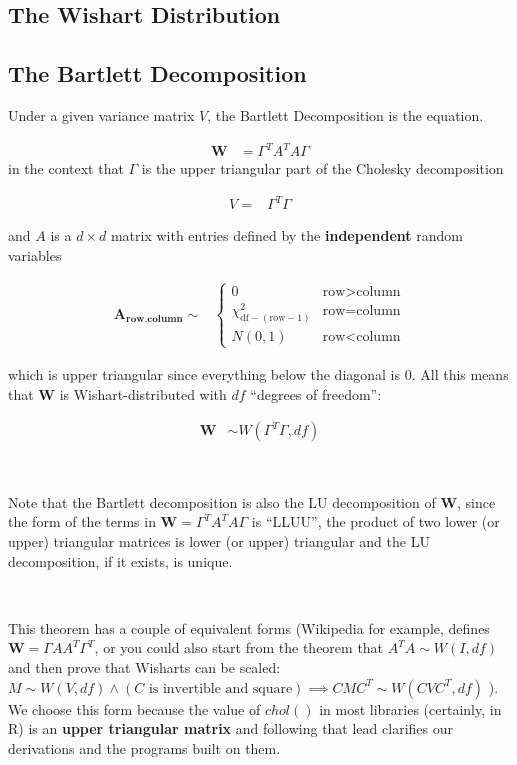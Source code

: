 \documentclass[english]{article}
\begin{document}
\subsection*{The Wishart Distribution}


\subsection*{The Bartlett Decomposition}

Under a given variance matrix $V$, the Bartlett Decomposition is
the equation.

\begin{align*}
\mathbf{W} & =\Gamma^{T}A^{T}A\Gamma
\end{align*}
in the context that $\Gamma$ is the upper triangular part of the
Cholesky decomposition

\begin{align*}
V= & \Gamma^{T}\Gamma
\end{align*}


and $A$ is a $d\times d$ matrix with entries defined by the \textbf{independent
}random variables

\begin{align*}
\mathbf{A_{\text{row},\text{column}}}\sim & \begin{cases}
0 & \text{row}>\text{column}\\
\chi_{\text{df}-(\text{row}-1)}^{2} & \text{row}=\text{column}\\
N(0,1) & \text{row}<\text{column}
\end{cases}
\end{align*}


which is upper triangular since everything below the diagonal is 0.
All this means that  $\mathbf{W}$ is Wishart-distributed with $df$
``degrees of freedom'':

\begin{align*}
\mathbf{W} & \sim W(\Gamma^{T}\Gamma,df)
\end{align*}


~

Note that the Bartlett decomposition is also the LU decomposition
of $\mathbf{W}$, since the form of the terms in $\mathbf{W}=\Gamma^{T}A^{T}A\Gamma$
is ``LLUU'', the product of two lower (or upper) triangular matrices
is lower (or upper) triangular and the LU decomposition, if it exists,
is unique.

~

This theorem has a couple of equivalent forms (Wikipedia  for example,
defines $\mathbf{W}=\Gamma AA^{T}\Gamma^{T}$, or you could also start
from the theorem that $A^{T}A\sim W(I,df)$ and then prove that Wisharts
can be scaled: $M\sim W(V,df)\wedge(C\text{ is invertible and square})\implies CMC^{T}\sim W(CVC^{T},df)$
). We choose this form because the value of $chol()$ in most libraries
(certainly, in R) is an \textbf{upper triangular matrix} and following
that lead clarifies our derivations and the programs built on them.
\end{document}
